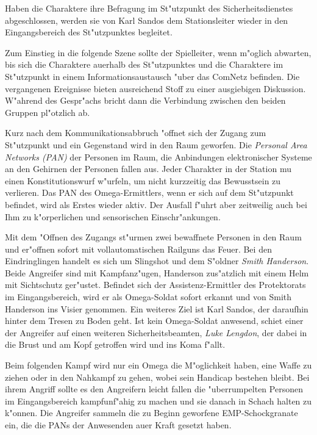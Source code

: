 
Haben die Charaktere ihre Befragung im St"utzpunkt des Sicherheitsdienstes abgeschlossen, werden sie von Karl Sandos dem Stationsleiter wieder in den Eingangsbereich des St"utzpunktes begleitet. 

\begin{remarks}
	Zum Einstieg in die folgende Szene sollte der Spielleiter, wenn m"oglich abwarten, bis sich die Charaktere au\3erhalb des St"utzpunktes und die Charaktere im St"utzpunkt in einem Informationsaustausch "uber das ComNetz befinden. Die vergangenen Ereignisse bieten ausreichend Stoff zu einer ausgiebigen Diskussion. W"ahrend des Gespr"achs bricht dann die Verbindung zwischen den beiden Gruppen pl"otzlich ab. 
\end{remarks}


Kurz nach dem Kommunikationsabbruch "offnet sich der Zugang zum St"utzpunkt und ein Gegenstand wird in den Raum geworfen. Die \emph{Personal Area Networks (PAN)} der Personen im Raum, die Anbindungen elektronischer Systeme an den Gehirnen der Personen fallen aus. Jeder Charakter in der Station mu\3 einen Konstitutionswurf w"urfeln, um nicht kurzzeitig das Bewusstsein zu verlieren. Das PAN des Omega-Ermittlers, wenn er sich auf dem St"utzpunkt befindet, wird als Erstes wieder aktiv. Der Ausfall f"uhrt aber zeitweilig auch bei Ihm zu k"orperlichen und sensorischen Einschr"ankungen.

Mit dem "Offnen des Zugangs st"urmen zwei bewaffnete Personen in den Raum und er"offnen sofort mit vollautomatischen Railguns das Feuer. Bei den Eindringlingen handelt es sich um Slingshot und dem S"oldner \emph{Smith Handerson}. Beide Angreifer sind mit Kampfanz"ugen, Handerson zus"atzlich mit einem Helm mit Sichtschutz ger"ustet. Befindet sich der Assistenz-Ermittler des Protektorats im Eingangsbereich, wird er als Omega-Soldat sofort erkannt und von Smith Handerson ins Visier genommen. Ein weiteres Ziel ist Karl Sandos, der daraufhin hinter dem Tresen zu Boden geht. Ist kein Omega-Soldat anwesend, schie\3t einer der Angreifer auf einen weiteren Sicherheitsbeamten, \emph{Luke Lengdon}, der dabei in die Brust und am Kopf getroffen wird und ins Koma f"allt. 

Beim folgenden Kampf wird nur ein Omega die M"oglichkeit haben, eine Waffe zu ziehen oder in den Nahkampf zu gehen, wobei sein Handicap bestehen bleibt. Bei ihrem Angriff sollte es den Angreifern leicht fallen die "uberrumpelten Personen im Eingangsbereich kampfunf"ahig zu machen und sie danach in Schach halten zu k"onnen.  Die Angreifer sammeln die zu Beginn geworfene EMP-Schockgranate ein, die die PANs der Anwesenden au\3er Kraft gesetzt haben.

